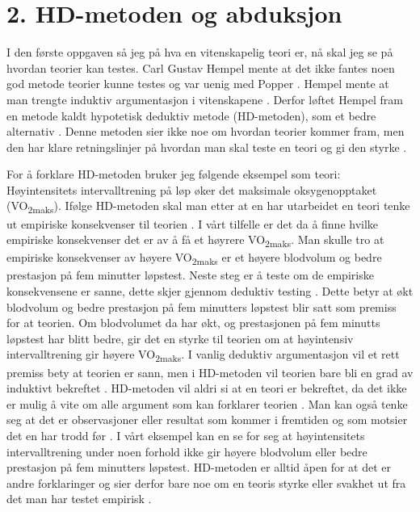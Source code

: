 \documentclass[
]{book}
\begin{document}
\hypertarget{hd-metoden-og-abduksjon}{%
\section{2. HD-metoden og abduksjon}\label{hd-metoden-og-abduksjon}}

I den første oppgaven så jeg på hva en vitenskapelig teori er, nå skal jeg se på hvordan teorier kan testes. Carl Gustav Hempel mente at det ikke fantes noen god metode teorier kunne testes og var uenig med Popper \citep{hempel1966}. Hempel mente at man trengte induktiv argumentasjon i vitenskapene \citep{hempel1966}. Derfor løftet Hempel fram en metode kaldt hypotetisk deduktiv metode (HD-metoden), som et bedre alternativ \citep{hempel1966}. Denne metoden sier ikke noe om hvordan teorier kommer fram, men den har klare retningslinjer på hvordan man skal teste en teori og gi den styrke \citep{hempel1966}.

For å forklare HD-metoden bruker jeg følgende eksempel som teori: Høyintensitets intervalltrening på løp øker det maksimale oksygenopptaket (VO\textsubscript{2maks}). Ifølge HD-metoden skal man etter at en har utarbeidet en teori tenke ut empiriske konsekvenser til teorien \citep{hempel1966}. I vårt tilfelle er det da å finne hvilke empiriske konsekvenser det er av å få et høyrere VO\textsubscript{2maks}. Man skulle tro at empiriske konsekvenser av høyere VO\textsubscript{2maks} er et høyere blodvolum og bedre prestasjon på fem minutter løpstest. Neste steg er å teste om de empiriske konsekvensene er sanne, dette skjer gjennom deduktiv testing \citep{hempel1966}. Dette betyr at økt blodvolum og bedre prestasjon på fem minutters løpstest blir satt som premiss for at teorien. Om blodvolumet da har økt, og prestasjonen på fem minutts løpstest har blitt bedre, gir det en styrke til teorien om at høyintensiv intervalltrening gir høyere VO\textsubscript{2maks}. I vanlig deduktiv argumentasjon vil et rett premiss bety at teorien er sann, men i HD-metoden vil teorien bare bli en grad av induktivt bekreftet \citep{hempel1966}. HD-metoden vil aldri si at en teori er bekreftet, da det ikke er mulig å vite om alle argument som kan forklarer teorien \citep{hempel1966}. Man kan også tenke seg at det er observasjoner eller resultat som kommer i fremtiden og som motsier det en har trodd før \citep{hempel1966}. I vårt eksempel kan en se for seg at høyintensitets intervalltrening under noen forhold ikke gir høyere blodvolum eller bedre prestasjon på fem minutters løpstest. HD-metoden er alltid åpen for at det er andre forklaringer og sier derfor bare noe om en teoris styrke eller svakhet ut fra det man har testet empirisk \citep{hempel1966}.
\end{document}
